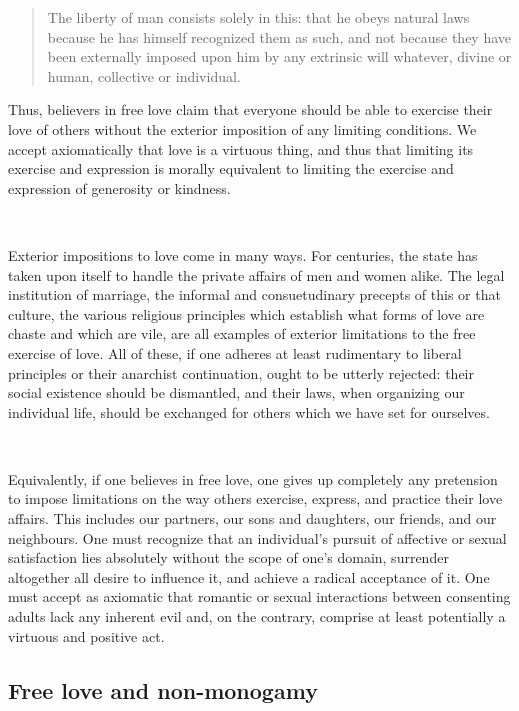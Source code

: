 \documentclass[a4paper, 12pt]{article}
\begin{document}
\begin{quote}
    The liberty of man consists solely in this: that he obeys natural laws
    because he has himself recognized them as such, and not because they have
    been externally imposed upon him by any extrinsic will whatever, divine or
    human, collective or individual. 
\end{quote}

Thus, believers in free love claim that everyone should be able to exercise their 
love of others without the exterior imposition of any limiting conditions. We accept 
axiomatically that love is a virtuous thing, and thus that limiting its
exercise and expression is morally equivalent to limiting the exercise and expression 
of generosity or kindness. 

~ 

Exterior impositions to love come in many ways. For centuries, the state has
taken upon itself to handle the private affairs of men and women alike. The
legal institution of marriage, the informal and consuetudinary precepts of this
or that culture, the various religious principles which establish what forms
of love are chaste and which are vile, are all examples of exterior limitations
to the free exercise of love. All of these, if one adheres at least rudimentary
to liberal principles or their anarchist continuation, ought to be utterly
rejected: their social existence should be dismantled, and their laws, when
organizing our individual life, should be exchanged for others which we have
set for ourselves.

~

Equivalently, if one believes in free love, one gives up completely any
pretension to impose limitations on the way others exercise, express, and
practice their love affairs. This includes our partners, our sons and
daughters, our friends, and our neighbours. One must recognize that an
individual's pursuit of affective or sexual satisfaction lies absolutely
without the scope of one's domain, surrender altogether all desire to influence
it, and achieve a radical acceptance of it. One must accept as axiomatic that 
romantic or sexual interactions between consenting adults lack any inherent evil
and, on the contrary, comprise at least potentially a virtuous and positive act.

\subsection{Free love and non-monogamy}
\end{document}
